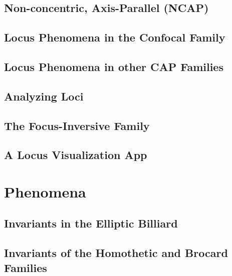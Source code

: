 \documentclass{book}
\begin{document}
\chapter{Non-concentric, Axis-Parallel (NCAP)}
\label{chap:04-n3-ncap}


\chapter[Confocal Loci]{Locus Phenomena in the Confocal Family}
\label{chap:05-confocal-loci}


\chapter[Loci in CAP Pairs]{Locus Phenomena in other CAP Families}
\label{chap:06-cap-loci}


\chapter{Analyzing Loci}
\label{chap:07-n3-loci}


\chapter{The Focus-Inversive Family}
\label{chap:08-focus-inversive}


\chapter{A Locus Visualization App}
\label{chap:09-experimental}


\part{ Phenomena}

\chapter[Billiard Invariants]{Invariants in the Elliptic Billiard}
 
\chapter[Homothetic and Brocard Invariants]{Invariants of the Homothetic and Brocard Families}
%
\end{document}

